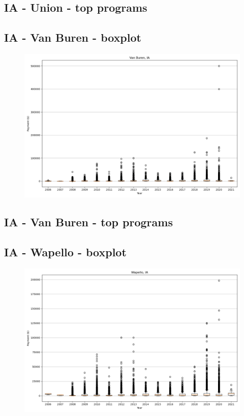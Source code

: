 \subsection*{IA - Union - top programs}

\newpage
\subsection*{IA - Van Buren - boxplot}
\begin{figure}[h]
\centering
\includegraphics[width=7in]{../output/boxplots/counties/Van Buren-IA_boxplot.png}
\end{figure}


\subsection*{IA - Van Buren - top programs}

\newpage
\subsection*{IA - Wapello - boxplot}
\begin{figure}[h]
\centering
\includegraphics[width=7in]{../output/boxplots/counties/Wapello-IA_boxplot.png}
\end{figure}


